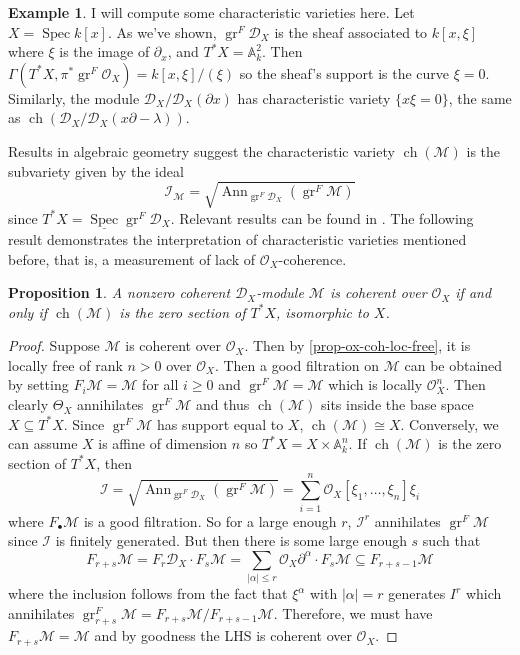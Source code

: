 \documentclass[11pt, a4paper]{article}
\newtheorem{proposition}[theorem]{Proposition}
\theoremstyle{definition}
\newtheorem{example}[theorem]{Example}
\newcommand{\gr}{\operatorname{gr}}
\newcommand{\Spec}[0]{\operatorname{Spec}}
\newcommand{\Ann}{\operatorname{Ann}}
\newcommand{\ch}{\operatorname{ch}}
\begin{document}
    \begin{example}
        I will compute some characteristic varieties here. Let $X=\Spec k[x]$. As we've shown, $\gr^F\mathcal D_X$ is the sheaf associated to $k[x, \xi]$ where $\xi$ is the image of $\partial_x$, and $T^*X=\mathbb A_k^2$. Then $\Gamma(T^*X, \pi^*\gr^F\mathcal O_X)=k[x,\xi]/(\xi)$ so the sheaf's support is the curve $\xi=0$. Similarly, the module $\mathcal D_X/\mathcal D_X(\partial x)$ has characteristic variety $\{x\xi=0\}$, the same as $\ch(\mathcal D_X/\mathcal D_X(x\partial-\lambda))$.
    \end{example}
    Results in algebraic geometry suggest the characteristic variety $\ch(\mathcal M)$ is the subvariety given by the ideal
    \[\mathcal I_{\mathcal M}=\sqrt{\Ann_{\gr^F\mathcal D_X}(\gr^F\mathcal M)}\]
    since $T^*X=\underline{\Spec}\gr^F\mathcal D_X$. Relevant results can be found in \cite{stacks-project}. The following result demonstrates the interpretation of characteristic varieties mentioned before, that is, a measurement of lack of $\mathcal O_X$-coherence.
    \begin{proposition}\label{prop-ox-coh-zero-sec}
        A nonzero coherent $\mathcal D_X$-module $\mathcal M$ is coherent over $\mathcal O_X$ if and only if $\ch(\mathcal M)$ is the zero section of $T^*X$, isomorphic to $X$.
    \end{proposition}
    \begin{proof}
        Suppose $\mathcal M$ is coherent over $\mathcal O_X$. Then by \cref{prop-ox-coh-loc-free}, it is locally free of rank $n>0$ over $\mathcal O_X$. Then a good filtration on $\mathcal M$ can be obtained by setting $F_i\mathcal M=\mathcal M$ for all $i\geqslant 0$ and $\gr^F\mathcal M=\mathcal M$ which is locally $\mathcal O_X^n$. Then clearly $\Theta_X$ annihilates $\gr^F\mathcal M$ and thus $\ch(\mathcal M)$ sits inside the base space $X\subseteq T^*X$. Since $\gr^F\mathcal M$ has support equal to $X$, $\ch(\mathcal M)\cong X$. Conversely, we can assume $X$ is affine of dimension $n$ so $T^*X=X\times\mathbb A_k^n$. If $\ch(\mathcal M)$ is the zero section of $T^*X$, then
        \[\mathcal I=\sqrt{\Ann_{\gr^F\mathcal D_X}(\gr^F\mathcal M)}=\sum_{i=1}^n\mathcal O_X[\xi_1,\dots,\xi_n]\xi_i\]
        where $F_\bullet\mathcal M$ is a good filtration. So for a large enough $r$, $\mathcal I^r$ annihilates $\gr^F\mathcal M$ since $\mathcal I$ is finitely generated. But then there is some large enough $s$ such that
        \[F_{r+s}\mathcal M=F_r\mathcal D_X\cdot F_{s}\mathcal M=\sum_{|\alpha|\leqslant r}\mathcal O_X\partial^\alpha\cdot F_s\mathcal M\subseteq F_{r+s-1}\mathcal M\]
        where the inclusion follows from the fact that $\xi^\alpha$ with $|\alpha|=r$ generates $I^r$ which annihilates $\gr^F_{r+s}\mathcal M=F_{r+s}\mathcal M/F_{r+s-1}\mathcal M$. Therefore, we must have $F_{r+s}\mathcal M=\mathcal M$ and by goodness the LHS is coherent over $\mathcal O_X$.
    \end{proof}
\end{document}
